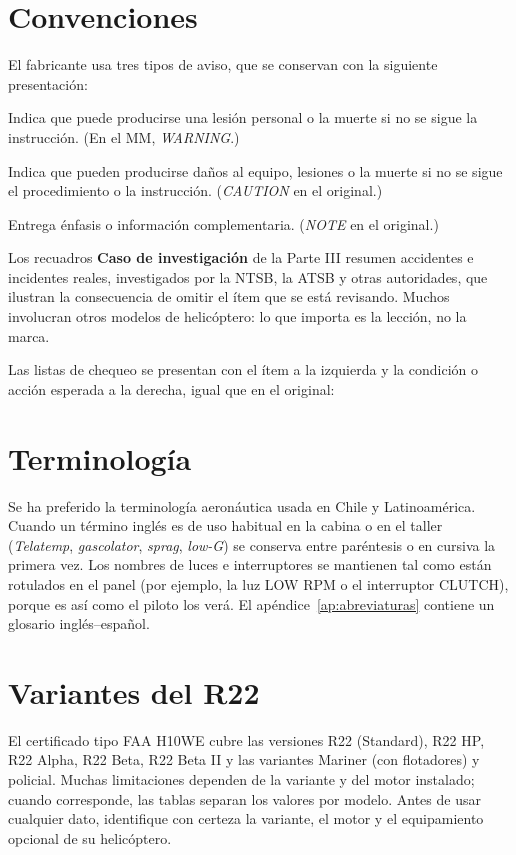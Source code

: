 \section{Convenciones}

El fabricante usa tres tipos de aviso, que se conservan con la siguiente presentación:

\begin{advertencia}
Indica que puede producirse una lesión personal o la muerte si no se sigue la instrucción. (En el MM, \emph{WARNING}.)
\end{advertencia}

\begin{precaucion}
Indica que pueden producirse daños al equipo, lesiones o la muerte si no se sigue el procedimiento o la instrucción. (\emph{CAUTION} en el original.)
\end{precaucion}

\begin{nota}
Entrega énfasis o información complementaria. (\emph{NOTE} en el original.)
\end{nota}

Los recuadros \textbf{Caso de investigación} de la Parte III resumen accidentes e incidentes reales, investigados por la NTSB, la ATSB y otras autoridades, que ilustran la consecuencia de omitir el ítem que se está revisando. Muchos involucran otros modelos de helicóptero: lo que importa es la lección, no la marca.

Las listas de chequeo se presentan con el ítem a la izquierda y la condición o acción esperada a la derecha, igual que en el original:

\begin{checklist}
\end{checklist}

\section{Terminología}

Se ha preferido la terminología aeronáutica usada en Chile y Latinoamérica. Cuando un término inglés es de uso habitual en la cabina o en el taller (\emph{Telatemp}, \emph{gascolator}, \emph{sprag}, \emph{low-G}) se conserva entre paréntesis o en cursiva la primera vez. Los nombres de luces e interruptores se mantienen tal como están rotulados en el panel (por ejemplo, la luz \textsf{LOW RPM} o el interruptor \textsf{CLUTCH}), porque es así como el piloto los verá. El apéndice~\ref{ap:abreviaturas} contiene un glosario inglés--español.

\section{Variantes del R22}

El certificado tipo FAA H10WE cubre las versiones R22 (Standard), R22 HP, R22 Alpha, R22 Beta, R22 Beta II y las variantes Mariner (con flotadores) y policial. Muchas limitaciones dependen de la variante y del motor instalado; cuando corresponde, las tablas separan los valores por modelo. Antes de usar cualquier dato, identifique con certeza la variante, el motor y el equipamiento opcional de su helicóptero.
